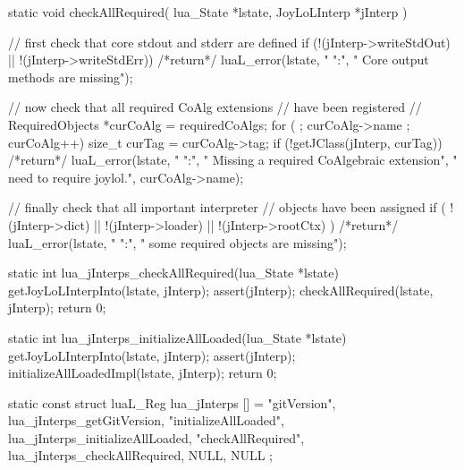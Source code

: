 \startCCode
static void checkAllRequired(
  lua_State    *lstate,
  JoyLoLInterp *jInterp
) {
  // first check that core stdout and stderr are defined
  if (!(jInterp->writeStdOut) || !(jInterp->writeStdErr)) {
    /*return*/ luaL_error(lstate, "%
      "\nERROR:\n",
      "  Core output methods are missing\n");
  }
  
  // now check that all required CoAlg extensions 
  // have been registered
  //
  RequiredObjects *curCoAlg = requiredCoAlgs;
  for ( ; curCoAlg->name ; curCoAlg++) {
    size_t curTag = curCoAlg->tag;
    if (!getJClass(jInterp, curTag)) {
      /*return*/ luaL_error(lstate, "%
        "\nERROR:\n",
       "  Missing a required CoAlgebraic extension\n",
       "  need to require joylol.",
       curCoAlg->name);
    }
  }
  
  // finally check that all important interpreter 
  // objects have been assigned
  if (
    !(jInterp->dict) || 
    !(jInterp->loader) ||
    !(jInterp->rootCtx)
  ) {
      /*return*/ luaL_error(lstate, "%
        "\nERROR:\n",
        "  some required objects are missing\n\n");
  }
}

static int lua_jInterps_checkAllRequired(lua_State *lstate) {
  getJoyLoLInterpInto(lstate, jInterp);
  assert(jInterp);
  checkAllRequired(lstate, jInterp);
  return 0;
}

static int lua_jInterps_initializeAllLoaded(lua_State *lstate) {
  getJoyLoLInterpInto(lstate, jInterp);
  assert(jInterp);
  initializeAllLoadedImpl(lstate, jInterp);
  return 0;
}
\stopCCode

\startCCode
static const struct luaL_Reg lua_jInterps [] = {
  {"gitVersion",          lua_jInterps_getGitVersion},
  {"initializeAllLoaded", lua_jInterps_initializeAllLoaded},
  {"checkAllRequired",    lua_jInterps_checkAllRequired},
  {NULL, NULL}
};
\stopCCode

